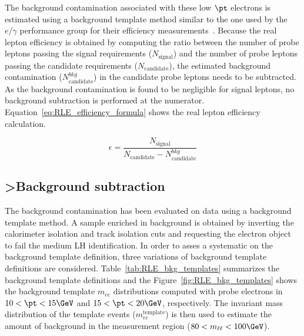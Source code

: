 The background contamination associated with these low $\pt$ electrons is estimated using a background template method similar to the one used by the $e/\gamma$ performance group for their efficiency measurements~\cite{ATLAS-CONF-2014-018}.
Because the real lepton efficiency is obtained by computing the ratio between the number of probe leptons passing the signal requirements ($N_{\textrm{signal}}$) and the number of probe leptons passing the candidate requirements ($N_{\textrm{candidate}}$), the estimated background contamination ($N_{\textrm{candidate}}^{bkg}$) in the candidate probe leptons needs to be subtracted.
As the background contamination is found to be negligible for signal leptons, no background subtraction is performed at the numerator.
Equation~\ref{eq:RLE_efficiency_formula} shows the real lepton efficiency calculation.

\begin{equation}
\epsilon = \frac{N_{\textrm{signal}}}{N_{\textrm{candidate}} - N_{\textrm{candidate}}^{bkg}}
\label{eq:RLE_efficiency_formula}
\end{equation}



\subsection{>Background subtraction}
\label{subsubsec:RLE_bkg_contamination}

The background contamination has been evaluated on data using a background template method.
A sample enriched in background is obtained by inverting the calorimeter isolation and track isolation cuts and requesting the electron object to fail the medium LH identification.
In order to asses a systematic on the background template definition, three variations of background template definitions are considered.
Table~\ref{tab:RLE_bkg_templates} summarizes the background template definitions and the Figure~\ref{fig:RLE_bkg_templates} shows the background template $m_{ee}$ distributions computed with probe electrons in $10<\pt<15 \GeV$ and $15<\pt<20 \GeV$, respectively.
The invariant mass distribution of the template events ($m_{ee}^{\textrm{template}}$) is then used to estimate the amount of background in the measurement region ($80<m_{\ell\ell}<100 \GeV$).

